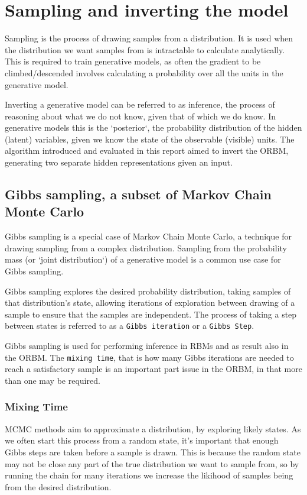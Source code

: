 \section{Sampling and inverting the model}

Sampling is the process of drawing samples from a distribution. It is used when the distribution we want samples from is intractable to calculate analytically. This is required to train generative models, as often the gradient to be climbed/descended involves calculating a probability over all the units in the generative model.

Inverting a generative model can be referred to as inference, the process of reasoning about what we do not know, given that of which we do know. In generative models this is the `posterior`, the probability distribution of the hidden (latent) variables, given we know the state of the observable (visible) units. The algorithm introduced and evaluated in this report aimed to invert the ORBM, generating two separate hidden representations given an input.

\subsection{Gibbs sampling, a subset of Markov Chain Monte Carlo}

Gibbs sampling is a special case of Markov Chain Monte Carlo, a technique for drawing sampling from a complex distribution. Sampling from the probability mass (or `joint distribution`) of a generative model is a common use case for Gibbs sampling.

Gibbs sampling explores the desired probability distribution, taking samples of that distribution's state, allowing iterations of exploration between drawing of a sample to ensure that the samples are independent. The process of taking a step between states is referred to as a \texttt{Gibbs iteration} or a \texttt{Gibbs Step}.

Gibbs sampling is used for performing inference in RBMs and as result also in the ORBM. The \texttt{mixing time}, that is how many Gibbs iterations are needed to reach a satisfactory sample is an important part issue in the ORBM, in that more than one may be required.

\subsubsection{Mixing Time}

MCMC methods aim to approximate a distribution, by exploring likely states. As we often start this process from a random state, it's important that enough Gibbs steps are taken before a sample is drawn. This is because the random state may not be close any part of the true distribution we want to sample from, so by running the chain for many iterations we increase the likihood of samples being from the desired distribution.

